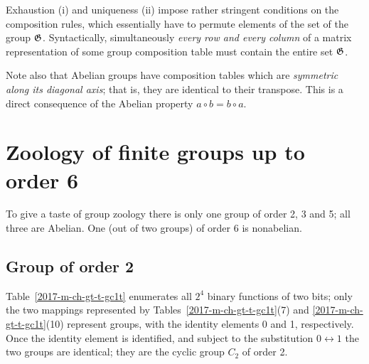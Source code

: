 Exhaustion (i) and uniqueness (ii) impose rather stringent conditions on the composition rules,
which essentially have to permute elements of the set of the group ${\frak G}$.
Syntactically,  simultaneously {\em every row and every column} of a matrix representation of some group composition table
must contain the entire set ${\frak G}$.

Note also that Abelian groups have composition tables which are {\em symmetric along its diagonal axis}; that is, they are identical to their transpose. This is a direct consequence
of the Abelian property $a \circ b = b \circ a$.


\section{Zoology of finite groups up to order 6}
To give a taste of group zoology there is only one group of order 2, 3 and 5;
all three are Abelian. One (out of two groups) of order 6 is nonabelian.

\subsection {Group of order 2}

Table~\ref{2017-m-ch-gt-t-gc1t}
enumerates all $2^4$ binary functions of two bits;
only the two mappings represented by Tables~\ref{2017-m-ch-gt-t-gc1t}(7) and \ref{2017-m-ch-gt-t-gc1t}(10) represent groups,
with the identity elements 0 and 1, respectively. Once the identity element is identified, and subject to the substitution $0 \leftrightarrow 1$
the two groups are identical; they are the cyclic group $C_2$ of order 2.

